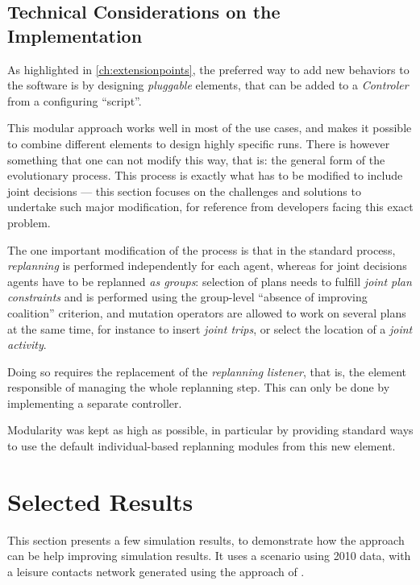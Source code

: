{\subsection{Technical Considerations on the Implementation}
As highlighted in \cref{ch:extensionpoints},
the preferred way to add new behaviors to the \matsim software is
by designing \emph{pluggable} elements,
that can be added to a \emph{Controler} from a configuring ``script''.

This modular approach works well in most of the use cases,
and makes it possible to combine different elements to design highly
specific runs.
There is however something that one can not modify this way,
that is: the general form of the evolutionary process.
This process is exactly what has to be modified to include joint decisions
--- 
this section focuses on the challenges and solutions to undertake such major
modification, for reference from developers facing this exact problem.

The one important modification of the process is that in the standard \matsim process,
\emph{replanning} is performed independently for each agent,
whereas for joint decisions agents have to be replanned \emph{as groups}:
selection of plans needs to fulfill \emph{joint plan constraints}
and is performed using the group-level ``absence of improving coalition''
criterion, and mutation operators are allowed to work on several plans at the same time,
for instance to insert \emph{joint trips}, or select the location of a
\emph{joint activity}.

Doing so requires the replacement of the \emph{replanning listener},
that is, the element responsible of managing the whole replanning step.
This can only be done by implementing a separate controller.

Modularity was kept as high as possible, in particular by providing standard ways
to use the default individual-based replanning modules from this new element.

\section{Selected Results\label{sec:td:results}}
This section presents a few simulation results,
to demonstrate how the approach can be help improving simulation results.
It uses a scenario using 2010 data,
with a leisure contacts network generated using the approach of .

}
